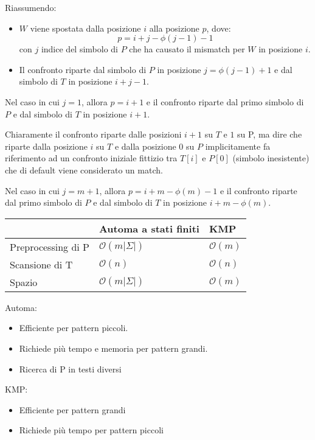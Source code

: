 Riassumendo:
\begin{itemize}
    \item $W$ viene spostata dalla posizione $i$ alla posizione $p$, dove: $$p = i + j - \phi(j - 1) - 1$$ con $j$ indice del simbolo di $P$ che ha causato il mismatch per $W$ in posizione $i$.
    \item Il confronto riparte dal simbolo di $P$ in posizione $j = \phi(j - 1) + 1$ e dal simbolo di $T$ in posizione $i + j - 1$.
\end{itemize}
Nel caso in cui $j = 1$, allora $p = i + 1$ e il confronto riparte dal primo simbolo di $P$ e dal simbolo di $T$ in posizione $i + 1$.
\begin{nota}
    Chiaramente il confronto riparte dalle posizioni $i + 1$ su $T$ e $1$ su P, ma dire che riparte dalla posizione $i$ su $T$ e dalla posizione $0$ su $P$ implicitamente fa riferimento ad un confronto iniziale fittizio tra $T[i]$ e $P[0]$ (simbolo inesistente) che di default viene considerato un match.
\end{nota}
Nel caso in cui $j = m + 1$, allora $p = i + m - \phi(m) - 1$ e il confronto riparte dal primo simbolo di $P$ e dal simbolo di $T$ in posizione $i + m - \phi(m)$.

\begin{table}[!ht]
    \centering
    \begin{tabular}{|l|l|l|}
    \hline
         & Automa a stati finiti & KMP \\ \hline
        Preprocessing di P & $\mathcal{O}(m | \Sigma |)$ & $\mathcal{O}(m)$ \\ \hline
        Scansione di T & $\mathcal{O}(n)$ & $\mathcal{O}(n)$ \\ \hline
        Spazio & $\mathcal{O}(m | \Sigma |)$ & $\mathcal{O}(m)$ \\ \hline
    \end{tabular}
\end{table}

Automa:
\begin{itemize}
    \item Efficiente per pattern piccoli.
    \item Richiede più tempo e memoria per pattern grandi.
    \item Ricerca di P in testi diversi
\end{itemize}
KMP:
\begin{itemize}
    \item Efficiente per pattern grandi
    \item Richiede più tempo per pattern piccoli
\end{itemize}

